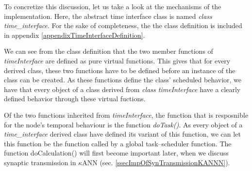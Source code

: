	To concretize this discussion, let us take a look at the mechanisms of the implementation.
	Here, the abstract time interface class is named \emph{class time\_interface}.
	For the sake of completeness, the the class definition is included in appendix \ref{appendixTimeInterfaceDefinition}. %

	We can see from the class definition that the two member functions of \emph{timeInterface} are defined as pure virtual functions.
	This gives that for every derived class, these two functions have to be defined before an instance of the class can be created.
	As these functions define the class' scheduled behavior, we have that every object of a class derived from \emph{class timeInterface} have a clearly defined behavior through these virtual fuctions.

	Of the two functions inherited from \emph{timeInterface}, %
		the function that is resposnible for the node's temporal behaviour is the function \emph{doTask()}.
	As every object of a \emph{time\_interface} derived class have defined its variant of this function, we can let this function be the function called by a global task--scheduler function. %
	The function doCalculation() will first become important later, when we discuss synaptic transmission in $\kappa$ANN (sec. \ref{ssecImpOfSynTransmissionKANNN}). 
	 

